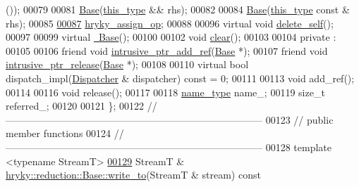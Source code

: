 \begin{DoxyCode}
      ());
00079 
00081     \hyperlink{classhryky_1_1reduction_1_1_base_a5ffe0568374d8b9b4c4ec32953fd6453}{Base}(\hyperlink{classhryky_1_1reduction_1_1_base}{this_type} && rhs);
00082 
00084     \hyperlink{classhryky_1_1reduction_1_1_base_a5ffe0568374d8b9b4c4ec32953fd6453}{Base}(\hyperlink{classhryky_1_1reduction_1_1_base}{this_type} \textcolor{keyword}{const} & rhs);
00085 
\hypertarget{reduction__base_8h_source_l00087}{}\hyperlink{classhryky_1_1reduction_1_1_base_a6f8f283a43f48c1599208b56f74d4403}{00087}     \hyperlink{classhryky_1_1reduction_1_1_base_a6f8f283a43f48c1599208b56f74d4403}{hryky_assign_op};
00088 
00096     \textcolor{keyword}{virtual} \textcolor{keywordtype}{void} \hyperlink{classhryky_1_1reduction_1_1_base_a100265b04179500cd7901c8afea64eb0}{delete_self}();
00097 
00099     \textcolor{keyword}{virtual} \hyperlink{classhryky_1_1reduction_1_1_base_a722da881b6c70cfcbde9243abcfbf334}{~Base}();
00100 
00102     \textcolor{keywordtype}{void} \hyperlink{classhryky_1_1reduction_1_1_base_a135bce05655e290c78fa83196199a576}{clear}();
00103 
00104 \textcolor{keyword}{private} :
00105 
00106     \textcolor{keyword}{friend} \textcolor{keywordtype}{void} \hyperlink{classhryky_1_1reduction_1_1_base_abf514baa69ca1c3228441e8614f59a34}{intrusive_ptr_add_ref}(\hyperlink{classhryky_1_1reduction_1_1_base}{Base} *);
00107     \textcolor{keyword}{friend} \textcolor{keywordtype}{void} \hyperlink{classhryky_1_1reduction_1_1_base_a5687cea108416379e4c11f156f2e6c95}{intrusive_ptr_release}(\hyperlink{classhryky_1_1reduction_1_1_base}{Base} *);
00108 
00110     \textcolor{keyword}{virtual} \textcolor{keywordtype}{bool} dispatch\_impl(\hyperlink{classhryky_1_1reduction_1_1_dispatcher}{Dispatcher} & dispatcher) \textcolor{keyword}{const} = 0;
00111 
00113     \textcolor{keywordtype}{void} add\_ref();
00114 
00116     \textcolor{keywordtype}{void} release();
00117 
00118     \hyperlink{classhryky_1_1reduction_1_1_string}{name_type}   name\_;
00119     \textcolor{keywordtype}{size\_t}      referred\_;
00120 
00121 \};
00122 \textcolor{comment}{//
      ------------------------------------------------------------------------------}
00123 \textcolor{comment}{// public member functions}
00124 \textcolor{comment}{//
      ------------------------------------------------------------------------------}
00128 \textcolor{comment}{}\textcolor{keyword}{template} <\textcolor{keyword}{typename} StreamT>
\hypertarget{reduction__base_8h_source_l00129}{}\hyperlink{classhryky_1_1reduction_1_1_base_a709cc7c48e1c90fe253739e46d82aa19}{00129} StreamT & \hyperlink{classhryky_1_1reduction_1_1_base_a709cc7c48e1c90fe253739e46d82aa19}{hryky::reduction::Base::write_to}(StreamT & stream)\textcolor{keyword}{ const}

\end{DoxyCode}
